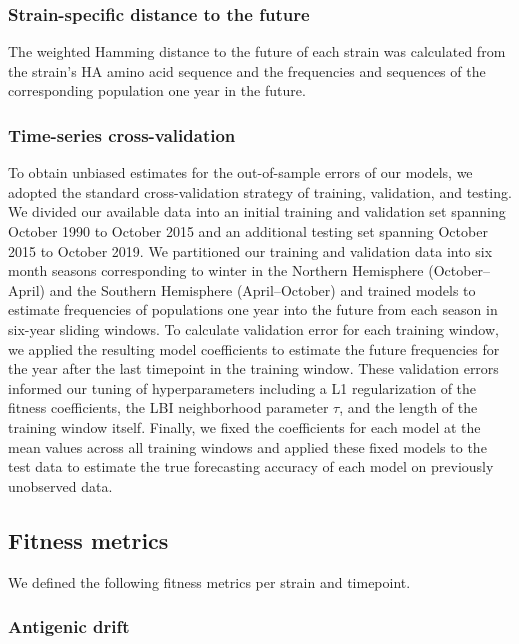 \subsubsection*{Strain-specific distance to the future}

The weighted Hamming distance to the future of each strain was calculated from the strain's HA amino acid sequence and the frequencies and sequences of the corresponding population one year in the future.

\subsubsection*{Time-series cross-validation}

To obtain unbiased estimates for the out-of-sample errors of our models, we adopted the standard cross-validation strategy of training, validation, and testing.
We divided our available data into an initial training and validation set spanning October 1990 to October 2015 and an additional testing set spanning October 2015 to October 2019.
We partitioned our training and validation data into six month seasons corresponding to winter in the Northern Hemisphere (October--April) and the Southern Hemisphere (April--October) and trained models to estimate frequencies of populations one year into the future from each season in six-year sliding windows.
To calculate validation error for each training window, we applied the resulting model coefficients to estimate the future frequencies for the year after the last timepoint in the training window.
These validation errors informed our tuning of hyperparameters including a L1 regularization of the fitness coefficients, the LBI neighborhood parameter $\tau$, and the length of the training window itself.
Finally, we fixed the coefficients for each model at the mean values across all training windows and applied these fixed models to the test data to estimate the true forecasting accuracy of each model on previously unobserved data.

\subsection*{Fitness metrics}

We defined the following fitness metrics per strain and timepoint.

\subsubsection*{Antigenic drift}

